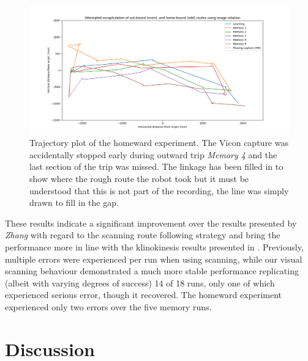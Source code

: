 \documentclass[a4paper,11pt,twoside,openright]{article}
\let\oldsection\section
\def\section{\cleardoublepage\oldsection}
\begin{document}
\begin{figure}
 \centering
  \includegraphics[width=\textwidth]{Homeward}
  \caption{
    \label{fig:home} Trajectory plot of the homeward experiment. The Vicon capture was accidentally stopped
    early during outward trip \textit{Memory 4} and the last section of the trip was missed. The linkage has
    been filled in to show where the rough route the robot took but it must be understood that this is not
    part of the recording, the line was simply drawn to fill in the gap. 
  }
\end{figure}

These results indicate a significant improvement over the results presented by \textit{Zhang} with regard to the
scanning route following strategy and bring the performance more in line with the klinokinesis results presented in
\cite{Zhang2017}. Previously, multiple errors were experienced per run when using scanning, while our visual scanning behaviour
demonstrated a much more stable performance replicating (albeit with varying degrees of success) 14 of 18 runs, only one of
which experienced serious error, though it recovered. The homeward experiment experienced only two errors over the five memory runs.
\newpage

\section{ Discussion } \label{sec:discussion}
\end{document}
